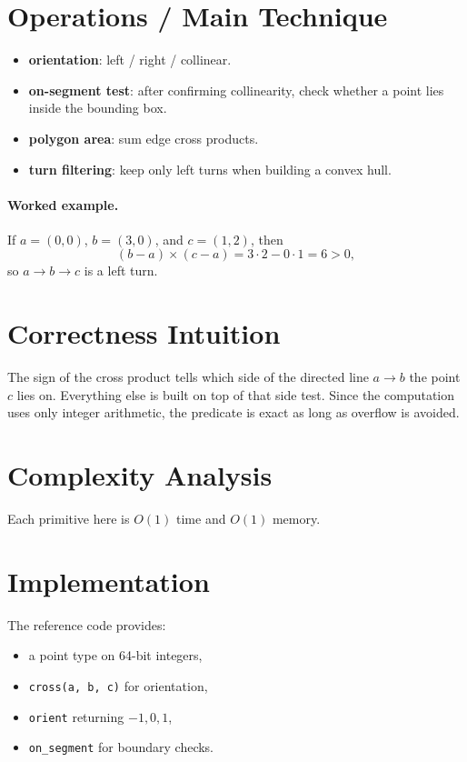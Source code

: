 \section*{Operations / Main Technique}

\begin{itemize}
  \item \textbf{orientation}: left / right / collinear.
  \item \textbf{on-segment test}: after confirming collinearity, check whether a point lies inside the bounding box.
  \item \textbf{polygon area}: sum edge cross products.
  \item \textbf{turn filtering}: keep only left turns when building a convex hull.
\end{itemize}

\paragraph{Worked example.}
If \(a = (0,0)\), \(b = (3,0)\), and \(c = (1,2)\), then
\[
(b-a) \times (c-a) = 3 \cdot 2 - 0 \cdot 1 = 6 > 0,
\]
so \(a \to b \to c\) is a left turn.

\section*{Correctness Intuition}

The sign of the cross product tells which side of the directed line \(a \to b\) the point \(c\) lies on. Everything
else is built on top of that side test. Since the computation uses only integer arithmetic, the predicate is exact as
long as overflow is avoided.

\section*{Complexity Analysis}

Each primitive here is \(O(1)\) time and \(O(1)\) memory.

\section*{Implementation}

The reference code provides:

\begin{itemize}
  \item a point type on 64-bit integers,
  \item \texttt{cross(a, b, c)} for orientation,
  \item \texttt{orient} returning \(-1, 0, 1\),
  \item \texttt{on\_segment} for boundary checks.
\end{itemize}

